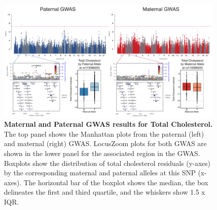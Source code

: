 \begin{figure}[!htb]
\centering
\includegraphics[width=5in]{img/ch02/fig-s6.pdf}
\caption[Maternal and Paternal GWAS results for Total Cholesterol.]{\textbf{Maternal and Paternal GWAS results for Total Cholesterol.}  The top panel shows the Manhattan plots from the paternal (left) and maternal (right) GWAS. LocusZoom plots for both GWAS are shown in the lower panel for the associated region in the GWAS. Boxplots show the distribution of total cholesterol residuals (y-axes) by the corresponding maternal and paternal alleles at this SNP (x-axes). The horizontal bar of the boxplot shows the median, the box delineates the first and third quartile, and the whiskers show 1.5 x IQR.}
\label{fig:fig-s6}
\end{figure}



